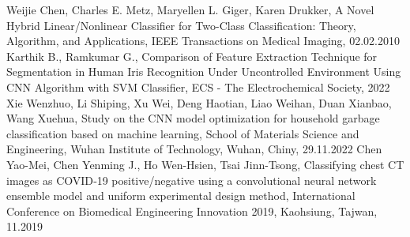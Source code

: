 \documentclass[12pt, a4paper, twoside, openany]{book}
\begin{document}
\begin{thebibliography}{9}
     Weijie Chen, Charles E. Metz, Maryellen L. Giger, Karen Drukker, A Novel Hybrid Linear/Nonlinear Classifier for Two-Class Classification: Theory, Algorithm, and Applications, IEEE Transactions on Medical Imaging, 02.02.2010
     Karthik B., Ramkumar G., Comparison of Feature Extraction Technique for Segmentation in Human Iris Recognition Under Uncontrolled Environment Using CNN Algorithm with SVM Classifier, ECS - The Electrochemical Society, 2022
     Xie Wenzhuo, Li Shiping, Xu Wei, Deng Haotian, Liao Weihan, Duan Xianbao, Wang Xuehua, Study on the CNN model optimization for household garbage classification based on machine learning, School of Materials Science and Engineering, Wuhan Institute of Technology, Wuhan, Chiny, 29.11.2022
     Chen Yao-Mei, Chen Yenming J., Ho Wen-Hsien, Tsai Jinn-Tsong, Classifying chest CT images as COVID‑19 positive/negative using a convolutional neural network ensemble model and uniform experimental design method, International Conference on Biomedical Engineering Innovation 2019, Kaohsiung, Tajwan, 11.2019
    \end{thebibliography}
\end{document}
